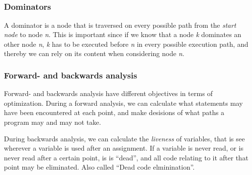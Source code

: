\documentclass[english,a4paper]{scrartcl}
\begin{document}
\subsection{}
\subsubsection{Dominators}
A dominator is a node that is traversed on every possible path from the
\emph{start node} to node \emph{n}. This is important since if we know that a
node \emph{k} dominates an other node \emph{n}, \emph{k} has to be executed
before \emph{n} in every possible execution path, and thereby we can rely on its
content when considering node \emph{n}.

\subsubsection{Forward- and backwards analysis}
Forward- and backwards analysis have different objectives in terms of
optimization. During a forward analysis, we can calculate what statements may
have been encountered at each point, and make desisions of what paths a program
may and may not take.

During backwards analysis, we can calculate the \emph{liveness} of variables,
that is see wherever a variable is used after an  assignment. If a variable is
never read, or is never read after a certain point, is is ``dead'', and all
code relating to it after that point may be eliminated. Also called ``Dead code
elminination''.
\end{document}
